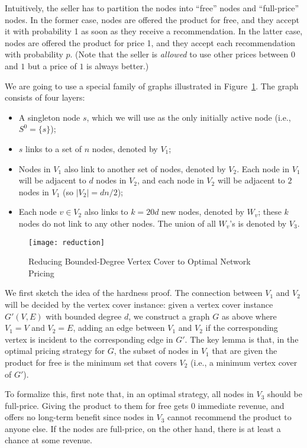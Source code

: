\documentclass[letterpaper,twoside]{article}
\begin{document}
Intuitively, the seller has to partition the nodes into ``free''
nodes and ``full-price'' nodes. In the former case, nodes are offered
the product for free, and they accept it with probability 1 as soon
as they receive a recommendation. In the latter case, nodes are
offered the product for price 1, and they accept each recommendation
with probability $p$. (Note that the seller is {\em allowed} to use
other prices between $0$ and $1$ but a price of $1$ is always
better.)

We are going to use a special family of graphs illustrated in
Figure~\ref{fig:reduction}. The graph consists of four layers:
\begin{itemize}
\item A singleton node $s$, which we will use as the only initially
  active node (i.e., $S^0=\{s\}$);
\item $s$ links to a set of $n$ nodes, denoted by $V_1$;
\item Nodes in $V_1$ also link to another set of nodes, denoted by $V_2$.
Each node in $V_1$ will be adjacent to $d$ nodes in $V_2$, and each
node in $V_2$ will be adjacent to $2$ nodes in $V_1$ (so
$|V_2|=dn/2$);
\item Each node $v\in V_2$ also links to $k = 20d$ new nodes, denoted by
$W_v$; these $k$ nodes do not link to any other nodes. The union of
all $W_v$'s is denoted by $V_3$.
\end{itemize}

\begin{figure}[htpb]
  \centering
  \texttt{[image: reduction]}
  \caption{Reducing Bounded-Degree Vertex Cover to Optimal Network Pricing}
  \label{fig:reduction}
\end{figure}

We first sketch the idea of the hardness proof. The connection
between $V_1$ and $V_2$ will be decided by the vertex cover
instance: given a vertex cover instance $G'(V,E)$ with bounded
degree $d$, we construct a graph $G$ as above where $V_1=V$ and
$V_2=E$, adding an edge between $V_1$ and $V_2$ if the corresponding
vertex is incident to the corresponding edge in $G'$. The key lemma
is that, in the optimal pricing strategy for $G$, the subset of nodes
in $V_1$ that are given the product for free is the minimum set that
covers $V_2$ (i.e., a minimum vertex cover of $G'$).

To formalize this, first note that, in an optimal strategy, all nodes
in $V_3$ should be full-price. Giving the product to them for free
gets 0 immediate revenue, and offers no long-term benefit since nodes
in $V_3$ cannot recommend the product to anyone else. If the nodes
are full-price, on the other hand, there is at least a chance at
some revenue.
\end{document}
